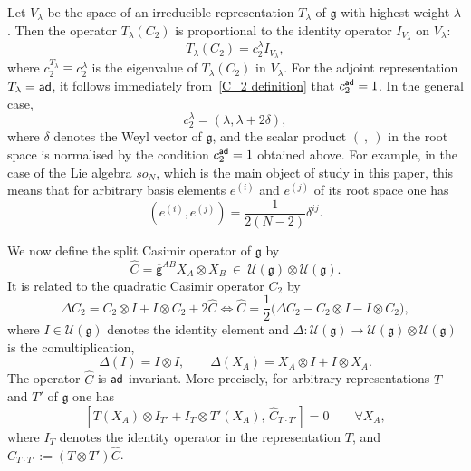 \documentclass[a4paper]{article}
\newcommand{\hC}{\widehat{C}}
\newcommand{\ad}{{\sf ad}}
\newcommand{\mcU}{\mathcal{U}}
\renewcommand{\=}{\ =\ }
\newcommand{\okg}{\overline{\mathsf{g}}}
\newcommand{\mfg}{\mathfrak{g}}
\numberwithin{equation}{section}
\theoremstyle{remark}
\begin{document}
Let $V_\lambda$ be the space of an irreducible representation $T_\lambda$ of $\mfg$ with highest weight $\lambda$. Then the operator $T_\lambda(C_2)$ is proportional to the identity operator $I_{V_\lambda}$ on $V_\lambda$:
\begin{equation}
T_\lambda(C_2) = c_2^{\lambda} I_{V_\lambda},
\end{equation}
where $c_2^{T_\lambda} \equiv c_2^{\lambda}$ is the eigenvalue of $T_\lambda(C_2)$ in $V_\lambda$. For the adjoint representation $T_\lambda = \ad$, it follows immediately from~\eqref{C_2 definition} that $c_2^{\ad} = 1$. In the general case,
\begin{equation}\label{c_2 via weights}
c_2^{\lambda} = (\lambda, \lambda + 2\delta),
\end{equation}
where $\delta$ denotes the Weyl vector of $\mfg$, and the scalar product $(\ ,\ )$ in the root space is normalised by the condition $c_2^{\ad} = 1$ obtained above. For example, in the case of the Lie algebra $so_N$, which is the main object of study in this paper, this means that for arbitrary basis elements $e^{(i)}$ and $e^{(j)}$ of its root space one has
\begin{equation}\label{Root product norm}
(e^{(i)}, e^{(j)}) = \frac{1}{2(N-2)} \delta^{ij}.
\end{equation}

We now define the split Casimir operator of $\mfg$ by
\begin{equation}\label{CasDef}
\hC=\okg^{AB}X_A\otimes X_B\ \in\  \mcU(\mfg)\otimes \mcU(\mfg).
\end{equation}
It is related to the quadratic Casimir operator $C_2$ by
\begin{equation}\label{C_2 and C_(2) relation}
\Delta C_2=C_2\otimes I+I\otimes C_2+2\hC
\iff
\hC=\frac{1}{2}\bigl(\Delta C_2-C_2\otimes I-I\otimes C_2\bigr),
\end{equation}
where $I\in\mcU(\mfg)$ denotes the identity element and
$\Delta:\mcU(\mfg)\to \mcU(\mfg)\otimes \mcU(\mfg)$ is the comultiplication,
\begin{equation}
\Delta(I)=I\otimes I,\qquad
\Delta(X_A)=X_A\otimes I+I\otimes X_A.
\end{equation}
The operator $\hC$ is $\ad$-invariant. More precisely, for arbitrary representations
$T$ and $T'$ of $\mfg$ one has
\begin{equation}
\label{adinv}
[T(X_A)\otimes I_{T'}+I_T\otimes T'(X_A),\,\hC_{T\cdot T'}]=0
\qquad \forall X_A,
\end{equation}
where $I_T$ denotes the identity operator in the representation $T$, and
$\hC_{T\cdot T'}:=(T\otimes T')\hC$.
\end{document}
